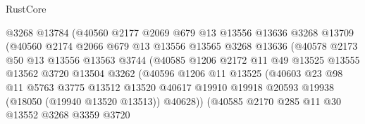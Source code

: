 \begin{lexlean}{RustCore}
\begin{coremodule}
                          @3268
                          @13784
                          (@40560
                            @2177
                            @2069
                            @679
                            @13
                            @13556
                            @13636
                            @3268
                            @13709
                            (@40560
                              @2174
                              @2066
                              @679
                              @13
                              @13556
                              @13565
                              @3268
                              @13636
                              (@40578
                                @2173
                                @50
                                @13
                                @13556
                                @13563
                                @3744
                                (@40585
                                  @1206
                                  @2172
                                  @11
                                  @49
                                  @13525
                                  @13555
                                  @13562
                                  @3720
                                  @13504
                                  @3262
                                  (@40596
                                    @1206
                                    @11
                                    @13525
                                    (@40603
                                      @23
                                      @98
                                      @11
                                      @5763
                                      @3775
                                      @13512
                                      @13520
                                      @40617
                                      @19910
                                      @19918
                                      @20593
                                      @19938
                                      (@18050 (@19940 @13520 @13513))
                                      @40628))
                                  (@40585
                                    @2170
                                    @285
                                    @11
                                    @30
                                    @13552
                                    @3268
                                    @3359
                                    @3720

\end{coremodule}
\end{lexlean}
